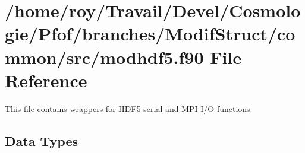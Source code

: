 \hypertarget{modhdf5_8f90}{\section{/home/roy/\-Travail/\-Devel/\-Cosmologie/\-Pfof/branches/\-Modif\-Struct/common/src/modhdf5.f90 File Reference}
\label{modhdf5_8f90}
}


This file contains wrappers for H\-D\-F5 serial and M\-P\-I I/\-O functions.  


\subsection*{Data Types}
